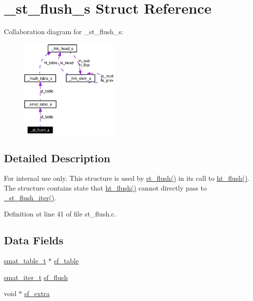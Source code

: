 \hypertarget{struct__st__flush__s}{
\section{\_\-st\_\-flush\_\-s Struct Reference}
\label{struct__st__flush__s}
}
Collaboration diagram for \_\-st\_\-flush\_\-s:\begin{figure}[H]
\begin{center}
\leavevmode
\includegraphics[width=140pt]{struct__st__flush__s__coll__graph}
\end{center}
\end{figure}


\subsection{Detailed Description}
\begin{Desc}
\item[For internal use only.]
This structure is used by \hyperlink{group__dbprim__smat_ga15}{st\_\-flush()} in its call to \hyperlink{group__dbprim__hash_ga16}{ht\_\-flush()}. The structure contains state that \hyperlink{group__dbprim__hash_ga16}{ht\_\-flush()} cannot directly pass to \hyperlink{group__dbprim__smat_ga30}{\_\-st\_\-flush\_\-iter()}.\end{Desc}




Definition at line 41 of file st\_\-flush.c.\subsection*{Data Fields}
\begin{CompactItemize}
\item 
\hyperlink{struct__smat__table__s}{smat\_\-table\_\-t} $\ast$ \hyperlink{struct__st__flush__s_o0}{sf\_\-table}
\item 
\hyperlink{group__dbprim__smat_ga4}{smat\_\-iter\_\-t} \hyperlink{struct__st__flush__s_o1}{sf\_\-flush}
\item 
void $\ast$ \hyperlink{struct__st__flush__s_o2}{sf\_\-extra}
\end{CompactItemize}


